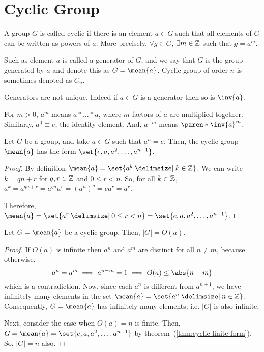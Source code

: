 \documentclass[11pt]{penrose}
\newcommand{\cyclic}[1]{\mean{#1}}
\newcommand{\keyword}[1]{\textsf{#1}}
\begin{document}
\section{Cyclic Group}
\begin{ndfn}
    A group $G$ is called \keyword{cyclic} if there is an element $a \in G$ such that all elements of $G$ can be written as powers of $a$. More precisely, $\forall g \in G$, $\exists m \in \mathbb{Z}$ such that $g = a^m$.

    Such as element $a$ is called a \keyword{generator} of $G$, and we say that $G$ is the group generated by $a$ and denote this as $G = \cyclic{a}$. Cyclic group of order $n$ is sometimes denoted as $C_n$.
\end{ndfn}

Generators are not unique. Indeed if $a \in G$ is a generator then so is $\inv{a}$.

\begin{notation}
    For $m > 0$, $a^m$ means $a * \dots * a$, where $m$ factors of $a$ are multiplied together. Similarly, $a^0 \equiv e$, the identity element. And, $a^{-m}$ means $\paren*{\inv{a}}^m$.
\end{notation}

\begin{nthm}\label{thm:cyclic-finite-form}
    Let $G$ be a group, and take $a \in G$ such that $a^n = e$. Then, the cyclic group $\cyclic{a}$ has the form $\set{e, a, a^2, \dots, a^{n-1}}$.
\end{nthm}
\begin{proof}
    By definition $\cyclic{a} = \set{a^k \st k \in \Z}$. We can write $k = qn + r$ for $q, r \in \mathbb{Z}$ and $0 \leq r < n$. So, for all $k \in \mathbb{Z}$, $a^k = a^{qn+r} = a^{qn} a^r = (a^{n})^{q} = e a^r = a^r$.

    Therefore, $\cyclic{a} = \set{a^r \st 0 \leq r < n} = \set{e, a, a^2, \dots, a^{n-1}}$.
\end{proof}

\begin{nthm}\label{thm:cyclic-group-order}
    Let $G = \cyclic{a}$ be a cyclic group. Then, $|G| = O(a)$.
\end{nthm}
\begin{proof}
    If $O(a)$ is infinite then $a^n$ and $a^m$ are distinct for all $n \neq m$, because otherwise,
    \begin{equation*}
        a^n = a^m \implies a^{n - m} = 1 \implies O(a) \leq \abs{n-m}
    \end{equation*}
    which is a contradiction. Now, since each $a^n$ is different from $a^{n+1}$, we have infinitely many elements in the set $\cyclic{a} = \set{a^n \st n \in \Z}$. Consequently, $G = \cyclic{a}$ has infinitely many elements; i.e. $|G|$ is also infinite.

    Next, consider the case when $O(a) = n$ is finite. Then, $G = \cyclic{a} = \set{e, a, a^2, \dots, a^{n-1}}$ by theorem~(\ref{thm:cyclic-finite-form}). So, $|G| = n$ also.
\end{proof}
\end{document}
